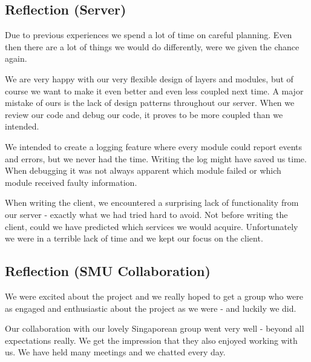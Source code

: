\subsection{Reflection (Server)}
Due to previous experiences we spend a lot of time on careful planning. Even then there are a lot of things we would do differently, were we given the chance again.

We are very happy with our very flexible design of layers and modules, but of course we want to make it even better and even less coupled next time. A major mistake of ours is the lack of design patterns throughout our server. When we review our code and debug our code, it proves to be more coupled than we intended. 

We intended to create a logging feature where every module could report events and errors, but we never had the time. Writing the log might have saved us time. When debugging it was not always apparent which module failed or which module received faulty information. 

When writing the client, we encountered a surprising lack of functionality from our server - exactly what we had tried hard to avoid. Not before writing the client, could we have predicted which services we would acquire. Unfortunately we were in a terrible lack of time and we kept our focus on the client.

\subsection{Reflection (SMU Collaboration)}
We were excited about the project and we really hoped to get a group who were as engaged and enthusiastic about the project as we were - and luckily we did.

Our collaboration with our lovely Singaporean group went very well - beyond all expectations really. We get the impression that they also enjoyed working with us. We have held many meetings and we chatted every day.
\newpage